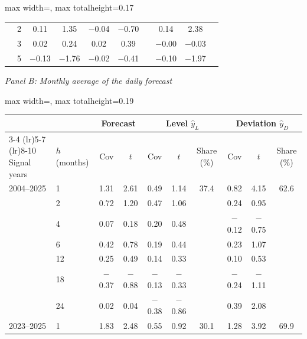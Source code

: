 \begin{table}[htbp]
{\begin{adjustbox}{max width=\linewidth, max totalheight=0.17\textheight}
\begin{tabular}{llcccccccc}
 & 2 & \phantom{$-$}0.11 & \phantom{$-$0}1.35 & $-$0.04 & $-$0.70 &  & \phantom{$-$}0.14 & \phantom{$-$0}2.38 &  \\
 & 3 & \phantom{$-$}0.02 & \phantom{$-$0}0.24 & \phantom{$-$}0.02 & \phantom{$-$}0.39 &  & $-$0.00 & \phantom{0}$-$0.03 &  \\
 & 5 & $-$0.13 & \phantom{0}$-$1.76 & $-$0.02 & $-$0.41 &  & $-$0.10 & \phantom{0}$-$1.97 &  \\
\bottomrule
\end{tabular}
\end{adjustbox}
\par\medskip
\textit{Panel B: Monthly average of the daily forecast}\\[2pt]
\begin{adjustbox}{max width=\linewidth, max totalheight=0.19\textheight}
\begin{tabular}{llcccccccc}
\toprule
\multicolumn{2}{c}{} & \multicolumn{2}{c}{Forecast} & \multicolumn{3}{c}{Level $\hat y_L$} & \multicolumn{3}{c}{Deviation $\hat y_D$} \\
\cmidrule(lr){3-4} \cmidrule(lr){5-7} \cmidrule(lr){8-10}
Signal years & $h$ (months) & Cov & $t$ & Cov & $t$ & Share (\%) & Cov & $t$ & Share (\%) \\
\midrule
2004--2025 & 1 & \phantom{$-$}1.31 & \phantom{$-$}2.61 & \phantom{$-$}0.49 & \phantom{$-$}1.14 & 37.4 & \phantom{$-$}0.82 & \phantom{$-$}4.15 & 62.6 \\
 & 2 & \phantom{$-$}0.72 & \phantom{$-$}1.20 & \phantom{$-$}0.47 & \phantom{$-$}1.06 &  & \phantom{$-$}0.24 & \phantom{$-$}0.95 &  \\
 & 4 & \phantom{$-$}0.07 & \phantom{$-$}0.18 & \phantom{$-$}0.20 & \phantom{$-$}0.48 &  & $-$0.12 & $-$0.75 &  \\
 & 6 & \phantom{$-$}0.42 & \phantom{$-$}0.78 & \phantom{$-$}0.19 & \phantom{$-$}0.44 &  & \phantom{$-$}0.23 & \phantom{$-$}1.07 &  \\
 & 12 & \phantom{$-$}0.25 & \phantom{$-$}0.49 & \phantom{$-$}0.14 & \phantom{$-$}0.33 &  & \phantom{$-$}0.10 & \phantom{$-$}0.53 &  \\
 & 18 & $-$0.37 & $-$0.88 & $-$0.13 & $-$0.33 &  & $-$0.24 & $-$1.11 &  \\
 & 24 & \phantom{$-$}0.02 & \phantom{$-$}0.04 & $-$0.38 & $-$0.86 &  & \phantom{$-$}0.39 & \phantom{$-$}2.08 &  \\
\midrule
2023--2025 & 1 & \phantom{$-$}1.83 & \phantom{$-$}2.48 & \phantom{$-$}0.55 & \phantom{$-$}0.92 & 30.1 & \phantom{$-$}1.28 & \phantom{$-$}3.92 & 69.9 \\

\end{tabular}
\end{adjustbox}}
\end{table}
